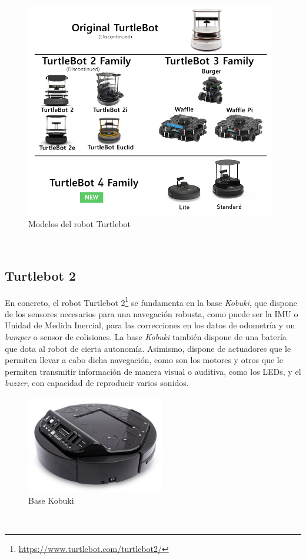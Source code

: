 \begin{figure} [h!]
  \begin{center}
    \includegraphics[width=11cm]{figs/turtlebot_family}
  \end{center}
  \caption{Modelos del robot Turtlebot \cite{turtlebot4}}
  \label{fig:turtlebots}
\end{figure}\

\subsection{Turtlebot 2}
\label{sec:turtlebot2}

En concreto, el robot Turtlebot
2\footnote{\url{https://www.turtlebot.com/turtlebot2/}} se fundamenta en la base
\textit{Kobuki}, que dispone de los sensores necesarios para una navegación
robusta, como puede ser la IMU o Unidad de Medida Inercial, para las
correcciones en los datos de odometría y un \textit{bumper} o sensor de
colisiones.
La base \textit{Kobuki} también dispone de una batería que dota al robot de
cierta autonomía.
Asimismo, dispone de actuadores que le permiten llevar a cabo dicha navegación,
como son los motores y otros que le permiten transmitir información de manera
visual o auditiva, como los LEDs, y el \textit{buzzer}, con capacidad de
reproducir varios sonidos.
\\

\begin{figure} [h!]
  \begin{center}
    \includegraphics[width=6cm]{figs/kobuki_base}
  \end{center}
  \caption{Base Kobuki \cite{kobuki_base}}
  \label{fig:base_kobuki}
\end{figure}\

